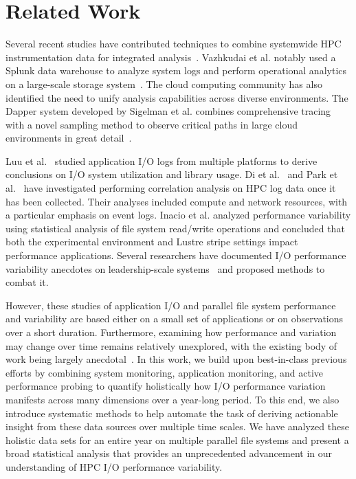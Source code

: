 \section{Related Work} \label{sec:related}

Several recent studies have contributed techniques to combine
systemwide HPC instrumentation data for integrated
analysis~\cite{Lockwood2017,Vazhkudai2017guide,Agelastos2014ldms,Kunkel2014siox,RIOT_2013}.
Vazhkudai et al. notably used a Splunk data warehouse to analyze system
logs and perform operational analytics on a large-scale storage system~\cite{Vazhkudai2017guide}.
The cloud computing community has also identified the need to unify
analysis capabilities across diverse environments.
The Dapper system
developed by Sigelman et al. combines comprehensive tracing with a novel
sampling method to observe critical paths in large cloud environments in great
detail~\cite{Sigelman2010dapper}.

Luu et al.~\cite{Luu:2015:HPDC} studied application I/O logs from multiple platforms to derive conclusions on I/O system utilization and library usage.
Di et al.~\cite{7973730} and Park et al.~\cite{Park2017BigDM} have
investigated performing correlation analysis on HPC log data once it has been
collected.  Their analyses included compute and network resources, with a
particular emphasis on event logs. Inacio et al. analyzed performance variability using statistical analysis of file system read/write operations and concluded that both the experimental environment and Lustre stripe settings impact performance applications. 
Several researchers have documented 
I/O performance variability anecdotes on leadership-scale
systems~\cite{Lofstead2010,Yildiz2016,carns2011understanding} and proposed
methods to combat it.  

However, these studies of application I/O and parallel file system performance and variability are based either on a small set of applications or on observations over a short duration.
Furthermore, examining how performance and variation may change over time remains relatively unexplored, with the existing body of work being largely anecdotal~\cite{Haryadi2018fail}.
In this work, we build upon best-in-class previous efforts by combining system monitoring, application monitoring, and active performance probing
to quantify holistically how I/O performance variation manifests across many dimensions over a year-long period.
To this end, we also introduce systematic methods to help automate the task of deriving actionable insight from these data sources over multiple time scales.
We have analyzed these holistic data sets for an entire year on multiple parallel file systems and present a broad statistical analysis that provides an unprecedented advancement in our understanding of HPC I/O performance variability.